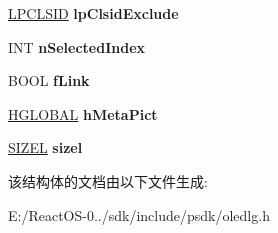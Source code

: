 \begin{DoxyCompactItemize}
\hyperlink{interface_g_u_i_d}{L\+P\+C\+L\+S\+ID} {\bfseries lp\+Clsid\+Exclude}
\item 
\mbox{\label{structtag_o_l_e_u_i_p_a_s_t_e_s_p_e_c_i_a_l_w_a79cd354fc56921fc98402712286da14e}} 
I\+NT {\bfseries n\+Selected\+Index}
\item 
\mbox{\label{structtag_o_l_e_u_i_p_a_s_t_e_s_p_e_c_i_a_l_w_ad1a9994d146aec2dc5127765dcba5155}} 
B\+O\+OL {\bfseries f\+Link}
\item 
\mbox{\label{structtag_o_l_e_u_i_p_a_s_t_e_s_p_e_c_i_a_l_w_a3313f1316d2fb0f146811b110c9da5e3}} 
\hyperlink{interfacevoid}{H\+G\+L\+O\+B\+AL} {\bfseries h\+Meta\+Pict}
\item 
\mbox{\label{structtag_o_l_e_u_i_p_a_s_t_e_s_p_e_c_i_a_l_w_a99d68462a70e7e52753ade7993234167}} 
\hyperlink{structtag_s_i_z_e}{S\+I\+Z\+EL} {\bfseries sizel}
\end{DoxyCompactItemize}


该结构体的文档由以下文件生成\+:\begin{DoxyCompactItemize}
\item 
E\+:/\+React\+O\+S-\/0../sdk/include/psdk/oledlg.\+h\end{DoxyCompactItemize}
